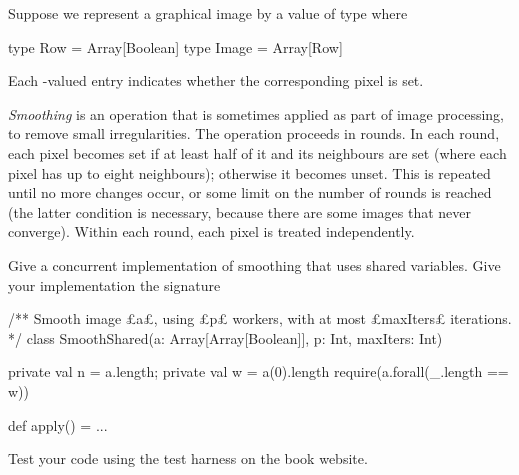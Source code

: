 \begin{question}
Suppose we represent a graphical image by a value of type  where 
\begin{scala}
  type Row = Array[Boolean]
  type Image = Array[Row]
\end{scala}
Each -valued entry indicates whether the corresponding pixel is
set.

\emph{Smoothing} is an operation that is sometimes applied as part of image
processing, to remove small irregularities.  The operation proceeds in rounds.
In each round, each pixel becomes set if at least half of it and its
neighbours are set (where each pixel has up to eight neighbours); otherwise it
becomes unset.  This is repeated until no more changes occur, or some limit on
the number of rounds is reached (the latter condition is necessary, because
there are some images that never converge).  Within each round, each pixel is
treated independently.

Give a concurrent implementation of smoothing that uses shared variables.
Give your implementation the signature
\begin{scala}
/** Smooth image £a£, using £p£ workers, with at most £maxIters£ iterations. */
class SmoothShared(a: Array[Array[Boolean]], p: Int, maxIters: Int){
  private val n = a.length; private val w = a(0).length
  require(a.forall(_.length == w))

  def apply() = ...
}
\end{scala}
%
Test your code using the test harness on the book website.
\end{question}



